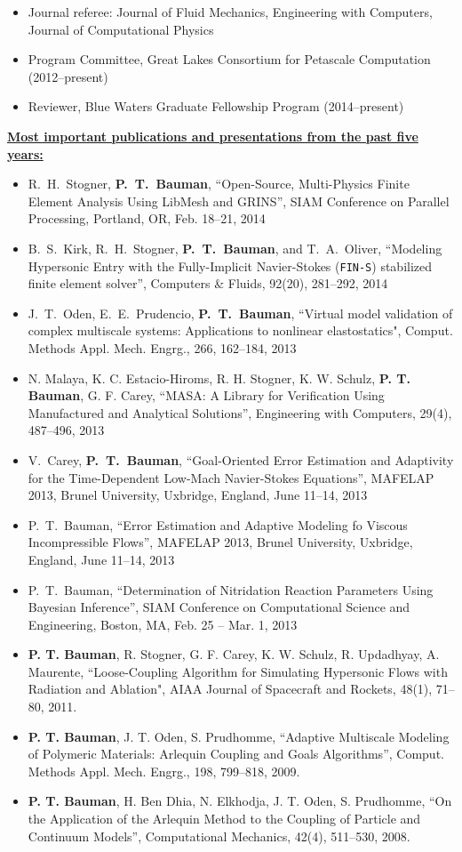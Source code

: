 \documentclass[12pt]{article}
\newcommand{\makesection}[1]{\underline{\bfseries #1:}}
\begin{document}
\begin{itemize}
\item Journal referee: Journal of Fluid Mechanics, Engineering with Computers, Journal of Computational Physics
\item Program Committee, Great Lakes Consortium for Petascale Computation (2012--present)
\item Reviewer, Blue Waters Graduate Fellowship Program (2014--present)
\end{itemize}

\makesection{Most important publications and presentations from the past five years}
\begin{itemize}
\item R.~H.~Stogner, \textbf{P.~T.~Bauman},
``Open-Source, Multi-Physics Finite Element Analysis Using LibMesh and GRINS'',
SIAM Conference on Parallel Processing, Portland, OR, Feb. 18--21, 2014
\item B.~S.~Kirk, R.~H.~Stogner, \textbf{P.~T.~Bauman}, and T.~A.~Oliver,
``Modeling Hypersonic Entry with the Fully-Implicit Navier-Stokes (\texttt{FIN-S})
stabilized finite element solver'', Computers \& Fluids, 92(20), 281--292, 2014
\item J.~T.~Oden, E.~E.~Prudencio, \textbf{P.~T.~Bauman},
``Virtual model validation of complex multiscale systems:
Applications to nonlinear elastostatics",
Comput. Methods Appl. Mech. Engrg., 266, 162--184, 2013
\item N. Malaya, K. C. Estacio-Hiroms, R. H. Stogner, K. W. Schulz, \textbf{P. T. Bauman},
G. F. Carey, ``MASA: A Library for Verification Using Manufactured and Analytical Solutions'',
Engineering with Computers, 29(4), 487--496, 2013
\item V.~Carey, \textbf{P.~T.~Bauman},
``Goal-Oriented Error Estimation and Adaptivity for the Time-Dependent Low-Mach Navier-Stokes Equations'',
MAFELAP 2013, Brunel University, Uxbridge, England, June 11--14, 2013
\item P.~T.~Bauman,
``Error Estimation and Adaptive Modeling fo Viscous Incompressible Flows'',
MAFELAP 2013, Brunel University, Uxbridge, England, June 11--14, 2013
\item P.~T.~Bauman,
``Determination of Nitridation Reaction Parameters Using Bayesian Inference'',
SIAM Conference on Computational Science and Engineering, Boston, MA, Feb. 25 -- Mar. 1, 2013
\item \textbf{P. T. Bauman}, R. Stogner, G. F. Carey, K. W. Schulz, R. Updadhyay, A. Maurente, ``Loose-Coupling Algorithm for Simulating
Hypersonic Flows with Radiation and Ablation", AIAA Journal of Spacecraft and Rockets, 48(1), 71--80, 2011.
\item \textbf{P. T. Bauman}, J. T. Oden, S. Prudhomme, ``Adaptive Multiscale Modeling of Polymeric Materials: Arlequin Coupling and Goals Algorithms'', Comput. Methods Appl. Mech. Engrg., 198, 799--818, 2009.
\item \textbf{P. T. Bauman}, H. Ben Dhia, N. Elkhodja, J. T. Oden, S. Prudhomme, ``On the Application of the Arlequin Method to the Coupling of Particle and Continuum Models'', Computational Mechanics, 42(4), 511--530, 2008.
\end{itemize}
\end{document}
